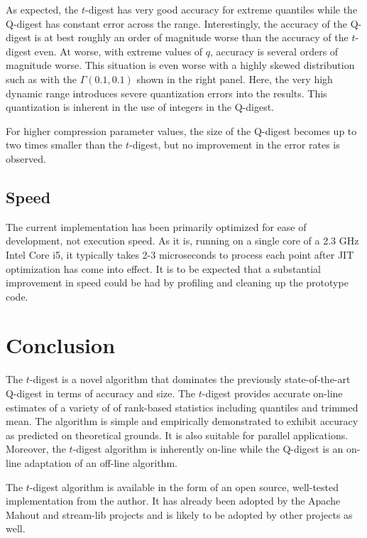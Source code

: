\documentclass[11pt]{amsart}
\begin{document}
As expected, the $t$-digest has very good accuracy for extreme quantiles while the Q-digest has constant error across the range.  Interestingly, the accuracy of the Q-digest is at best roughly an order of magnitude worse than the accuracy of the $t$-digest even.  At worse, with extreme values of $q$, accuracy is several orders of magnitude worse.  This situation is even worse with a highly skewed distribution such as with the $\Gamma(0.1, 0.1)$ shown in the right panel.  Here, the very high dynamic range introduces severe quantization errors into the results.  This quantization is inherent in the use of integers in the Q-digest.

For higher compression parameter values, the size of the Q-digest becomes up to two times smaller than the $t$-digest, but no improvement in the error rates is observed.

\subsection{Speed}
The current implementation has been primarily optimized for ease of development, not execution speed.  As it is, running on a single core of a 2.3 GHz Intel Core i5, it typically takes 2-3 microseconds to process each point after JIT optimization has come into effect.  It is to be expected that a substantial improvement in speed could be had by profiling and cleaning up the prototype code.

\section{Conclusion}
The $t$-digest is a novel algorithm that dominates the previously state-of-the-art Q-digest in terms of accuracy and size.  The $t$-digest provides accurate on-line estimates of a variety of of rank-based statistics including quantiles and trimmed mean.  The algorithm is simple and empirically demonstrated to exhibit accuracy as predicted on theoretical grounds.  It is also suitable for parallel applications.  Moreover, the $t$-digest algorithm is inherently on-line while the Q-digest is an on-line adaptation of an off-line algorithm.

The $t$-digest algorithm is available in the form of an open source, well-tested implementation from the author.  It has already been adopted by the Apache Mahout and stream-lib projects and is likely to be adopted by other projects as well.


{}
\end{document}
